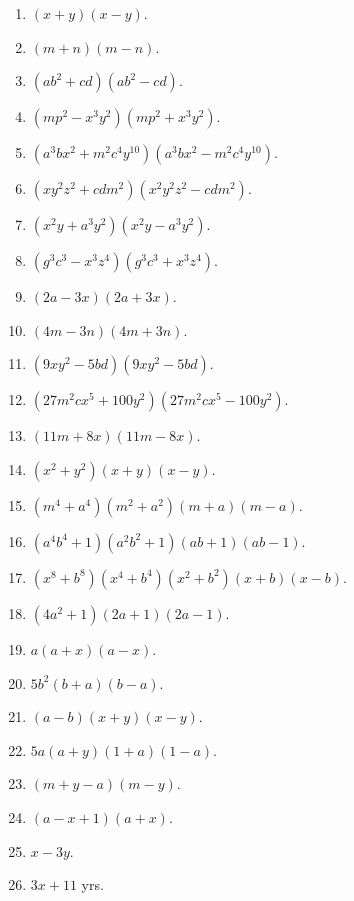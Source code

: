 \documentclass{book}
\begin{document}
\begin{enumerate}

\item $(x+y)(x-y)$.

\item $(m + n)(m - n)$.

\item $(ab^2 + cd)(ab^2 - cd)$.

\item $(mp^2 - x^3y^2)(mp^2 + x^3y^2)$.

\item $(a^3bx^2 + m^2c^4y^{10})(a^3bx^2 - m^2c^4y^{10})$.

\item $(xy^2z^2 + cdm^2)(x^2y^2z^2 - cdm^2)$.

\item $(x^2y +a^3y^2)(x^2y - a^3y^2)$.

\item $(g^3c^3 - x^3z^4)(g^3c^3 + x^3z^4)$.

\item $(2a - 3x)(2a + 3x)$.

\item $(4m - 3n)(4m + 3n)$.

\item $(9xy^2 - 5bd)(9xy^2 - 5bd)$.

\item $(27m^2cx^5 + 100y^2)(27m^2cx^5 - 100y^2)$.

\item $(11m + 8x)(11m - 8x)$.

\item $(x^2 + y^2)(x + y)(x - y)$.

\item $(m^4 + a^4)(m^2 + a^2)(m + a)(m - a)$.

\item $(a^4b^4 + 1)(a^2b^2 + 1)(ab + 1)(ab - 1)$.

\item $(x^8 + b^8)(x^4 + b^4)(x^2 + b^2)(x + b)(x - b)$.

\item $(4a^2 + 1)(2a + 1)(2a - 1)$.

\item $a(a + x)(a - x)$.

\item $5b^2(b + a)(b - a)$.

\item $(a - b)(x + y)(x - y)$.

\item $5a(a + y)(1 + a)(1 - a)$.

\item $(m + y - a)(m - y)$.

\item $(a - x + 1)(a + x)$.

\item $x - 3y$.

\item $3x + 11$ yrs.

\end{enumerate}
\end{document}
